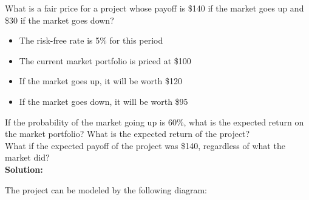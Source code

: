 \begin{example}
    \label{ex:replication}
    What is a fair price for a project whose payoff is \$140 if the market goes up and \$30 if the market goes down?\\
    \begin{itemize}
        \item The risk-free rate is 5\% for this period
        \item The current market portfolio is priced at \$100
        \item If the market goes up, it will be worth \$120
        \item If the market goes down, it will be worth \$95
    \end{itemize}
    If the probability of the market going up is 60\%, what is the expected return on the market portfolio? What is the expected return of the project?\\
    What if the expected payoff of the project was \$140, regardless of what the market did?\\

    \textbf{Solution:}

    The project can be modeled by the following diagram:



\end{example}
